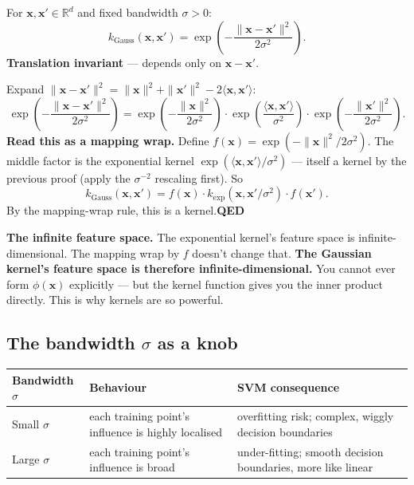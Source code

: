 \documentclass[11pt, a4paper]{article}
\newcommand{\thead}[1]{\textbf{#1}}
\newcommand{\doflag}{\textcolor{defBd}{\textbf{[DO]}}\,}
\begin{document}
\begin{defbox}
For $\mathbf{x}, \mathbf{x}' \in \mathbb{R}^d$ and fixed bandwidth $\sigma > 0$:
\[
k_{\text{Gauss}}(\mathbf{x}, \mathbf{x}') = \exp\!\left(-\frac{\|\mathbf{x} - \mathbf{x}'\|^2}{2\sigma^2}\right).
\]
\textbf{Translation invariant} — depends only on $\mathbf{x} - \mathbf{x}'$.
\end{defbox}

\begin{exbox}[\doflag{}Proof: Gaussian kernel]
Expand $\|\mathbf{x} - \mathbf{x}'\|^2 = \|\mathbf{x}\|^2 + \|\mathbf{x}'\|^2 - 2\langle\mathbf{x}, \mathbf{x}'\rangle$:
\[
\exp\!\left(-\frac{\|\mathbf{x} - \mathbf{x}'\|^2}{2\sigma^2}\right) = \exp\!\left(-\frac{\|\mathbf{x}\|^2}{2\sigma^2}\right)\cdot \exp\!\left(\frac{\langle\mathbf{x}, \mathbf{x}'\rangle}{\sigma^2}\right) \cdot \exp\!\left(-\frac{\|\mathbf{x}'\|^2}{2\sigma^2}\right).
\]
\textbf{Read this as a mapping wrap.} Define $f(\mathbf{x}) = \exp(-\|\mathbf{x}\|^2 / 2\sigma^2)$. The middle factor is the exponential kernel $\exp(\langle\mathbf{x}, \mathbf{x}'\rangle / \sigma^2)$ — itself a kernel by the previous proof (apply the $\sigma^{-2}$ rescaling first). So
\[
k_{\text{Gauss}}(\mathbf{x}, \mathbf{x}') = f(\mathbf{x})\cdot k_{\text{exp}}(\mathbf{x}, \mathbf{x}'/\sigma^2)\cdot f(\mathbf{x}').
\]
By the mapping-wrap rule, this is a kernel.\hfill\textbf{QED}
\end{exbox}

\textbf{The infinite feature space.} The exponential kernel's feature space is infinite-dimensional. The mapping wrap by $f$ doesn't change that. \textbf{The Gaussian kernel's feature space is therefore infinite-dimensional.} You cannot ever form $\phi(\mathbf{x})$ explicitly — but the kernel function gives you the inner product directly. This is why kernels are so powerful.

\subsection{\texorpdfstring{The bandwidth $\sigma$ as a knob}{The bandwidth sigma as a knob}}

\begin{tabularx}{\linewidth}{@{}lXX@{}}
\toprule
\thead{Bandwidth $\sigma$} & \thead{Behaviour} & \thead{SVM consequence} \\
\midrule
Small $\sigma$ & each training point's influence is highly localised & overfitting risk; complex, wiggly decision boundaries \\
Large $\sigma$ & each training point's influence is broad        & under-fitting; smooth decision boundaries, more like linear \\
\bottomrule
\end{tabularx}
\end{document}
